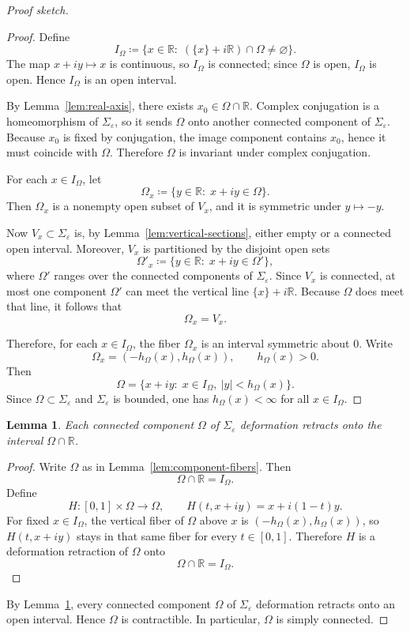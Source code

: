 \documentclass[11pt]{article}
\newtheorem{lemma}[theorem]{Lemma}
\begin{document}
\begin{proof}[Proof sketch]
\begin{proof}
Define
\[
I_\Omega
\coloneqq
\{x\in\mathbb R:\; (\{x\}+i\mathbb R)\cap\Omega\neq\varnothing\}.
\]
The map \(x+iy\mapsto x\) is continuous, so \(I_\Omega\) is connected; since \(\Omega\) is open,
\(I_\Omega\) is open. Hence \(I_\Omega\) is an open interval.

By Lemma~\ref{lem:real-axis}, there exists \(x_0\in\Omega\cap\mathbb R\).
Complex conjugation is a homeomorphism of \(\Sigma_\varepsilon\), so it sends \(\Omega\)
onto another connected component of \(\Sigma_\varepsilon\). Because \(x_0\) is fixed by
conjugation, the image component contains \(x_0\), hence it must coincide with \(\Omega\).
Therefore \(\Omega\) is invariant under complex conjugation.

For each \(x\in I_\Omega\), let
\[
\Omega_x
\coloneqq
\{y\in\mathbb R:\; x+iy\in\Omega\}.
\]
Then \(\Omega_x\) is a nonempty open subset of \(V_x\), and it is symmetric under
\(y\mapsto -y\).

Now \(V_x\subset\Sigma_\varepsilon\) is, by Lemma~\ref{lem:vertical-sections}, either empty
or a connected open interval. Moreover, \(V_x\) is partitioned by the disjoint open sets
\[
\Omega'_x\coloneqq \{y\in\mathbb R:\; x+iy\in\Omega'\},
\]
where \(\Omega'\) ranges over the connected components of \(\Sigma_\varepsilon\).
Since \(V_x\) is connected, at most one component \(\Omega'\) can meet the vertical line
\(\{x\}+i\mathbb R\). Because \(\Omega\) does meet that line, it follows that
\[
\Omega_x=V_x.
\]

Therefore, for each \(x\in I_\Omega\), the fiber \(\Omega_x\) is an interval symmetric
about \(0\). Write
\[
\Omega_x=(-h_\Omega(x),h_\Omega(x)),
\qquad h_\Omega(x)>0.
\]
Then
\[
\Omega
=
\{x+iy:\; x\in I_\Omega,\ |y|<h_\Omega(x)\}.
\]
Since \(\Omega\subset\Sigma_\varepsilon\) and \(\Sigma_\varepsilon\) is bounded, one has
\(h_\Omega(x)<\infty\) for all \(x\in I_\Omega\).
\end{proof}

\begin{lemma}\label{lem:deformation-retract}
Each connected component \(\Omega\) of \(\Sigma_\varepsilon\) deformation retracts
onto the interval \(\Omega\cap\mathbb R\).
\end{lemma}

\begin{proof}
Write \(\Omega\) as in Lemma~\ref{lem:component-fibers}. Then
\[
\Omega\cap\mathbb R = I_\Omega.
\]
Define
\[
H:[0,1]\times\Omega\longrightarrow\Omega,
\qquad
H(t,x+iy)=x+i(1-t)y.
\]
For fixed \(x\in I_\Omega\), the vertical fiber of \(\Omega\) above \(x\) is
\((-h_\Omega(x),h_\Omega(x))\), so \(H(t,x+iy)\) stays in that same fiber for every
\(t\in[0,1]\). Therefore \(H\) is a deformation retraction of \(\Omega\) onto
\[
\Omega\cap\mathbb R=I_\Omega.
\]
\end{proof}

By Lemma~\ref{lem:deformation-retract}, every connected component \(\Omega\) of
\(\Sigma_\varepsilon\) deformation retracts onto an open interval. Hence \(\Omega\) is
contractible. In particular, \(\Omega\) is simply connected.
\end{proof}
\end{document}
